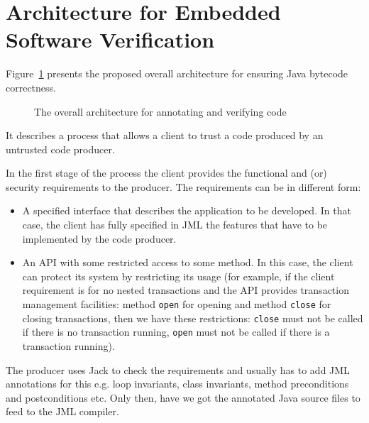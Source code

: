\section{Architecture for Embedded Software Verification}
\label{architecture_s}	
Figure~\ref{architecture} presents the proposed overall architecture for ensuring Java bytecode correctness. 
\begin{figure}[ht!]
\begin{center}
\caption{The overall architecture for annotating and verifying code}
\label{architecture}
\end{center}
\end{figure}
It describes a process that allows a client to trust a code produced by an untrusted code producer.

In the first stage of the process the client provides the functional and (or) security requirements to the producer. The requirements can be in different form:
\begin{itemize}
\item A specified interface that describes the application to be developed. In that case, the client has fully specified in JML the features that have to be implemented by the code producer.
\item An API with some restricted access to some method. In this case, the client can protect its system by restricting its usage (for example, if the client requirement is for no nested transactions and the API provides transaction management facilities: method \texttt{open} for opening and method \texttt{close} for closing transactions, then we have these restrictions: \texttt{close} must not be called if there is no transaction running, \texttt{open} must not be called if there is a transaction running).   
\end{itemize}
The producer uses Jack to check the requirements and usually has to add JML annotations for this %
e.g. loop invariants, class invariants, method preconditions and postconditions etc. Only then, have we got the annotated Java source files to feed to the JML compiler.

